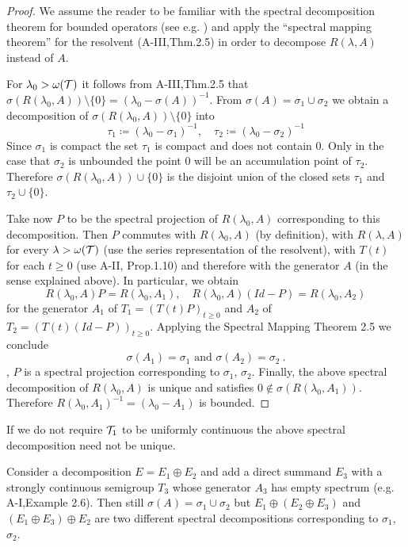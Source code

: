 \begin{proof}
We assume the reader to be familiar with the spectral decomposition theorem for bounded operators (see e.g. \citet[p.572]{dunfordschwartz:1958}) and apply the \enquote{spectral mapping theorem} for the resolvent (A-III,Thm.2.5) in order to decompose $R(\lambda,A)$ instead of $A$.

For $\lambda_{0} > \omega(\mathcal{T})$ it follows from A-III,Thm.2.5 that $\sigma(R(\lambda_{0},A)) \setminus \{0\} = (\lambda_{0} - \sigma(A))^{-1}$.
From $\sigma(A) = \sigma_{1} \cup \sigma_{2}$ we obtain a decomposition of $\sigma(R(\lambda_{0},A)) \setminus \{0\}$ into
\[
\tau_{1} \coloneqq (\lambda_{0}-\sigma_{1})^{-1}, \quad \tau_{2} \coloneqq (\lambda_{0}-\sigma_{2})^{-1}
\]
Since $\sigma_{1}$ is compact the set $\tau_{1}$ is compact and does not contain $0$.
Only in the case that $\sigma_{2}$ is unbounded the point $0$ will be an accumulation point of $\tau_{2}$.
Therefore $\sigma(R(\lambda_{0},A)) \cup \{0\}$ is the disjoint union of the closed sets $\tau_{1}$ and $\tau_{2} \cup \{0\}$.

Take now $P$ to be the spectral projection of $R(\lambda_{0},A)$ corresponding to this decomposition.
Then $P$ commutes with $R(\lambda_{0},A)$ (by definition), with $R(\lambda,A)$ for every $\lambda > \omega(\mathcal{T})$ (use the series representation of the resolvent), with $T(t)$ for each $t \geq 0$ (use A-II, Prop.1.10) and therefore with the generator $A$ (in the sense explained above).
In particular, we obtain
\[
R(\lambda_{0},A)P = R(\lambda_{0},A_{1}), \quad R(\lambda_{0},A)(Id-P) = R(\lambda_{0},A_{2})
\]
for the generator $A_{1}$ of $T_{1} = (T(t)P)_{t \geq 0}$ and $A_{2}$ of $T_{2} = (T(t)(Id-P))_{t \geq 0}$.
Applying the Spectral Mapping Theorem 2.5 we conclude
\[
\sigma(A_{1}) = \sigma_{1} \text{ and } \sigma(A_{2}) = \sigma_{2}~.
\]
\ie, $P$ is a spectral projection corresponding to $\sigma_{1}$, $\sigma_{2}$.
Finally, the above spectral decomposition of $R(\lambda_{0},A)$ is unique and satisfies $0 \notin \sigma(R(\lambda_{0},A_{1}))$.
Therefore $R(\lambda_{0},A_{1})^{-1} = (\lambda_{0}-A_{1})$ is bounded.
\end{proof}
If we do not require $\mathcal{T}_{1}$ to be uniformly continuous the above spectral decomposition need not be unique.
\begin{example}\label{ex:a3-x.y}
Consider a decomposition $E = E_{1} \oplus E_{2}$ and add a direct summand $E_{3}$ with a strongly continuous semigroup $T_{3}$ whose generator $A_{3}$ has empty spectrum (e.g. A-I,Example 2.6).
Then still $\sigma(A) = \sigma_{1} \cup \sigma_{2}$ but $E_{1} \oplus (E_{2} \oplus E_{3})$ and $(E_{1} \oplus E_{3}) \oplus E_{2}$ are two different spectral decompositions corresponding to $\sigma_{1}$, $\sigma_{2}$.
\end{example}
